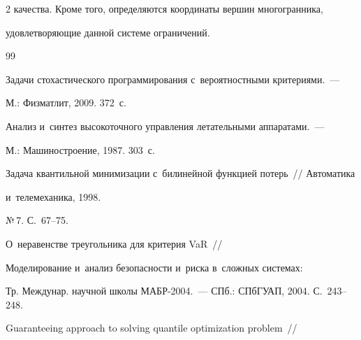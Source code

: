 \begin{multicols}{2}
качества. Кроме того, определяются координаты вер\-шин многогранника, 

удовле\-тво\-ря\-ющие данной сис\-те\-ме ограничений.







{\small\frenchspacing

 {%


 \begin{thebibliography}{99}





Задачи стохастического программирования с~вероятностными критериями.~--- 

М.: Физматлит, 2009. 372~с.





Анализ и~синтез высокоточного управления летательными аппаратами.~--- 

М.: Машиностроение, 1987. 303~с.





Задача квантильной минимизации с~билинейной функцией потерь~// Автоматика

и~телемеханика, 1998. 

№\,7. С.~67--75.





О~неравенстве треугольника  для критерия VaR~//  

Моделирование и~анализ без\-опас\-ности и~рис\-ка в~слож\-ных сис\-те\-мах: 

Тр. Междунар. научной школы МАБР-2004.~--- СПб.: СПбГУАП,  2004. С.~243--248.









Guaranteeing approach to solving quantile optimization problem~// 


\end{thebibliography}}}
\end{multicols}
